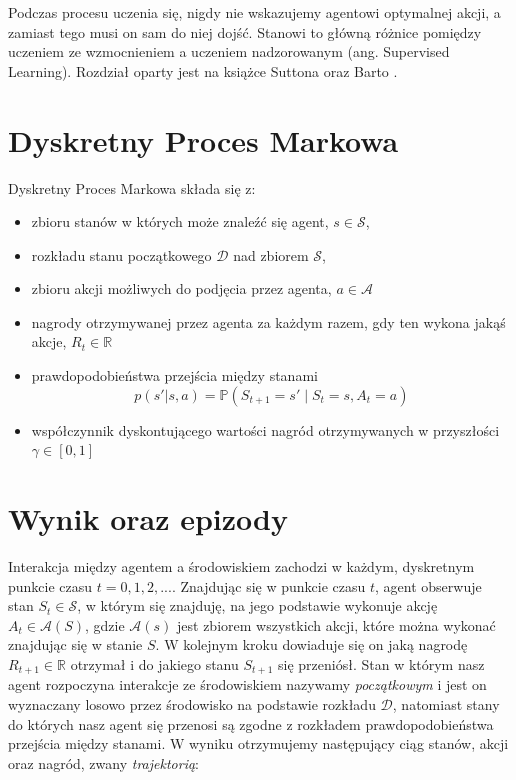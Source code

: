 \documentclass[licencjacka]{pracamgr}
\begin{document}
Podczas procesu uczenia się, nigdy nie wskazujemy agentowi optymalnej akcji, a zamiast tego musi on sam do niej dojść. Stanowi to główną różnice pomiędzy uczeniem ze wzmocnieniem a uczeniem nadzorowanym (ang. Supervised Learning). Rozdział oparty jest na książce Suttona oraz Barto \cite{Sutton}.

\section{Dyskretny Proces Markowa}

Dyskretny Proces Markowa składa się z:
\begin{itemize}
\item zbioru stanów w których może znaleźć się agent, $ s \in \mathcal{S} $,
\item rozkładu stanu początkowego $\mathcal{D}$ nad zbiorem $\mathcal{S}$,
\item zbioru akcji możliwych do podjęcia przez agenta, $ a \in \mathcal{A} $
\item nagrody otrzymywanej przez agenta za każdym razem, gdy ten wykona jakąś akcje, $ R_t \in \mathbb{R} $
\item prawdopodobieństwa przejścia między stanami
$$ p(s'|s, a) = \mathbb{P}(S_{t+1} = s' \mid S_t = s, A_t = a)$$
\item współczynnik dyskontującego wartości nagród otrzymywanych w przyszłości $ \gamma \in [0, 1] $
\end{itemize}


\section{Wynik oraz epizody}

Interakcja między agentem a środowiskiem zachodzi w każdym, dyskretnym punkcie czasu $ t = 0, 1, 2, ... $. Znajdując się w punkcie czasu $t$, agent obserwuje stan $ S_t \in \mathcal{S} $, w którym się znajduję, na jego podstawie wykonuje akcję $ A_t \in \mathcal{A}(S) $, gdzie $ \mathcal{A}(s) $ jest zbiorem wszystkich akcji, które można wykonać znajdując się w stanie $S$. W kolejnym kroku dowiaduje się on jaką nagrodę $ R_{t+1} \in \mathbb{R} $ otrzymał i do jakiego stanu $ S_{t+1} $ się przeniósł. Stan w którym nasz agent rozpoczyna interakcje ze środowiskiem nazywamy \emph{początkowym} i jest on wyznaczany losowo przez środowisko na podstawie rozkładu $\mathcal{D}$, natomiast stany do których nasz agent się przenosi są zgodne z rozkładem prawdopodobieństwa przejścia między stanami. W wyniku otrzymujemy następujący ciąg stanów, akcji oraz nagród, zwany \emph{trajektorią}:
\end{document}
